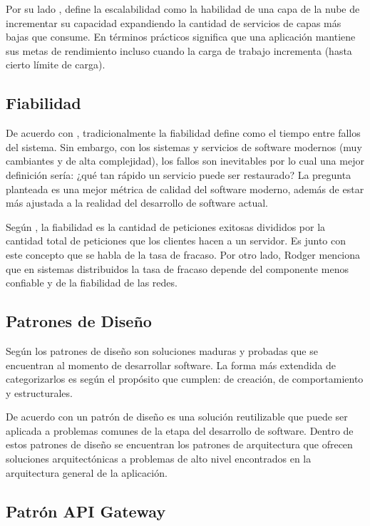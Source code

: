 Por su lado \cite{lehrig2015scalability}, define la escalabilidad como la habilidad de una capa
de la nube de incrementar su capacidad expandiendo la cantidad de servicios de capas más bajas
que consume.
En términos prácticos significa que una aplicación mantiene sus metas de rendimiento incluso cuando
la carga de trabajo incrementa (hasta cierto límite de carga).


\subsection{Fiabilidad}

De acuerdo con \cite{humble2018accelerate}, tradicionalmente la fiabilidad define como el tiempo
entre fallos del sistema.
Sin embargo, con los sistemas y servicios de software modernos (muy cambiantes y de alta complejidad),
los fallos son inevitables por lo cual una mejor definición sería: ¿qué tan rápido un servicio puede
ser restaurado?
La pregunta planteada es una mejor métrica de calidad del software moderno, además de estar más ajustada
a la realidad del desarrollo de software actual.

Según \cite{rodger2017tao}, la fiabilidad es la cantidad de peticiones exitosas divididos
por la cantidad total de peticiones que los clientes hacen a un servidor.
Es junto con este concepto que se habla de la tasa de fracaso.
Por otro lado, Rodger menciona que en sistemas distribuidos la tasa de fracaso depende del
componente menos confiable y de la fiabilidad de las redes.


\subsection{Patrones de Diseño}

Según \cite{cosmin2016patrones} los patrones de diseño son soluciones maduras y probadas que
se encuentran al momento de desarrollar software.
La forma más extendida de categorizarlos es según el propósito que cumplen: de creación, de comportamiento
y estructurales.

De acuerdo con \cite{lo2022architectural} un patrón de diseño es una solución reutilizable que puede
ser aplicada a problemas comunes de la etapa del desarrollo de software.
Dentro de estos patrones de diseño se encuentran los patrones de arquitectura que ofrecen soluciones
arquitectónicas a problemas de alto nivel encontrados en la arquitectura general de la aplicación.

\subsection{Patrón API Gateway}

